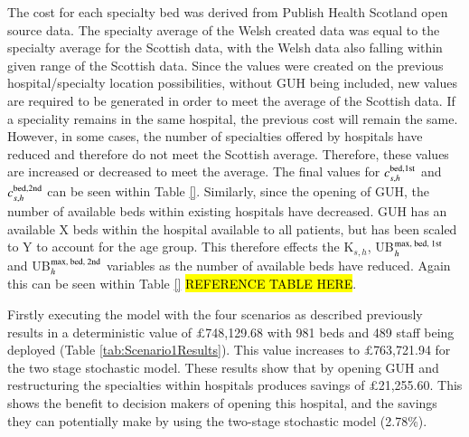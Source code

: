 \documentclass[../thesis.tex]{subfiles}
\begin{document}
The cost for each specialty bed was derived from Publish Health Scotland open source data. The specialty average of the Welsh created data was equal to the specialty average for the Scottish data, with the Welsh data also falling within given range of the Scottish data. Since the values were created on the previous hospital/specialty location possibilities, without GUH being included, new values are required to be generated in order to meet the average of the Scottish data. If a speciality remains in the same hospital, the previous cost will remain the same. However, in some cases, the number of specialties offered by hospitals have reduced and therefore do not meet the Scottish average. Therefore, these values are increased or decreased to meet the average. The final values for $c^\textnormal{bed,1st}_{s,h}$ and $c^\textnormal{bed,2nd}_{s,h}$ can be seen within Table \ref{}. Similarly, since the opening of GUH, the number of available beds within existing hospitals have decreased. GUH has an available X beds within the hospital available to all patients, but has been scaled to Y to account for the age group. This therefore effects the K$_{s,h}$, UB$^\textnormal{max, bed, 1st}_{h}$ and UB$^\textnormal{max, bed, 2nd}_{h}$ variables as the number of available beds have reduced. Again this can be seen within Table \ref{} \hl{REFERENCE TABLE HERE}.



Firstly executing the model with the four scenarios as described previously results in a deterministic value of $\pounds$748,129.68 with 981 beds and 489 staff being deployed (Table \ref{tab:Scenario1Results}). This value increases to $\pounds$763,721.94 for the two stage stochastic model. These results show that by opening GUH and restructuring the specialties within hospitals produces savings of $\pounds$21,255.60. This shows the benefit to decision makers of opening this hospital, and the savings they can potentially make by using the two-stage stochastic model (2.78\%).
\end{document}
